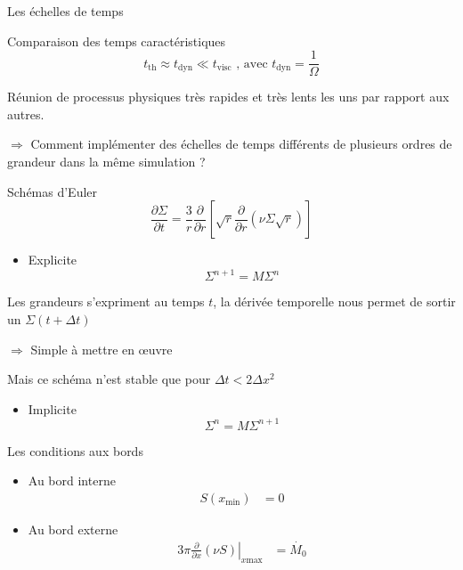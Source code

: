 \documentclass{beamer}
\begin{document}
\begin{frame}{Les échelles de temps}
\begin{block}{Comparaison  des temps caractéristiques}
\[
t_\text{th} \approx t_\text{dyn} \ll t_\text{visc}\text{  , avec   } t_\text{dyn} = \frac{1}{\Omega}
\]
\end{block}

Réunion de processus physiques très rapides et très lents les uns par rapport aux autres.

\pause

$\Rightarrow $  Comment implémenter des échelles de temps différents de plusieurs ordres de grandeur dans la même simulation ?

\end{frame}

\begin{frame}{Schémas d'Euler}
\begin{equation}
    \frac{\partial {\Sigma}}{\partial t} = \frac{3}{r}\frac{\partial}{\partial r}\left[\sqrt{r}\frac{\partial}{\partial r}(\nu \Sigma\sqrt{r})\right]
    \end{equation}
\begin{itemize}
\item{Explicite}
\[\Sigma^{n+1} = M\Sigma^n\]
\end{itemize}
Les grandeurs s'expriment au temps $t$, la dérivée temporelle nous permet de sortir un $\Sigma(t+\Delta t)$

$\Rightarrow$ Simple à mettre en œuvre

Mais ce schéma n'est stable que pour $ \Delta t < 2 \Delta x ^2$

\begin{itemize}
\item{Implicite}
\[\Sigma^{n} = M\Sigma^{n+1}\]
\end{itemize}

\end{frame}


\begin{frame}{Les conditions aux bords}
\begin{itemize}
\item Au bord interne
\begin{align}
S(x_\text{min}) &= 0
\end{align}
\item Au bord externe
\begin{align}
\left.3\pi\frac{\partial}{\partial x}\left(\nu S\right)\right|_{x\text{max}} &= \dot{M_0}\label{S_conditionExt}
\end{align}

\end{itemize}
\end{frame}
\end{document}
